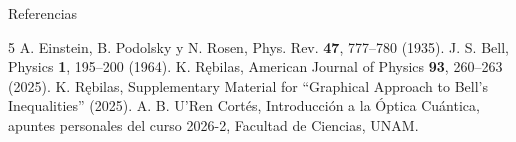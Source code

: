 \begin{frame}{Referencias}{}
	\footnotesize
	\begin{thebibliography}{5}
		 A. Einstein, B. Podolsky y N. Rosen, Phys. Rev. \textbf{47}, 777--780 (1935).
		 J. S. Bell, Physics \textbf{1}, 195--200 (1964).
		 K. R\k{e}bilas, American Journal of Physics \textbf{93}, 260--263 (2025).
		 K. R\k{e}bilas, Supplementary Material for ``Graphical Approach to Bell's Inequalities'' (2025).
		 A. B. U'Ren Cortés, Introducción a la Óptica Cuántica, apuntes personales del curso 2026-2, Facultad de Ciencias, UNAM.
	\end{thebibliography}
\end{frame}
